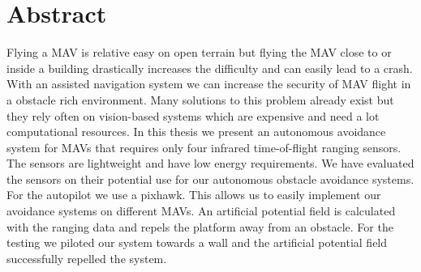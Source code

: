 \chapter*{Abstract}
Flying a MAV is relative easy on open terrain but flying the MAV close to or inside a building drastically increases the difficulty and can easily lead to a crash. With an assisted navigation system we can increase the security of MAV flight in a obstacle rich environment. Many solutions to this problem already exist but they rely often on vision-based systems which are expensive and need a lot computational resources. In this thesis we present an autonomous avoidance system for MAVs that requires only four infrared time-of-flight ranging sensors. The sensors are lightweight and have low energy requirements. We have evaluated the sensors on their potential use for our autonomous obstacle avoidance systems. For the autopilot we use a pixhawk. This allows us to easily implement our avoidance systems on different MAVs. An artificial potential field is calculated with the ranging data and repels the platform away from an obstacle. For the testing we piloted our system towards a wall and the artificial potential field successfully repelled the system.